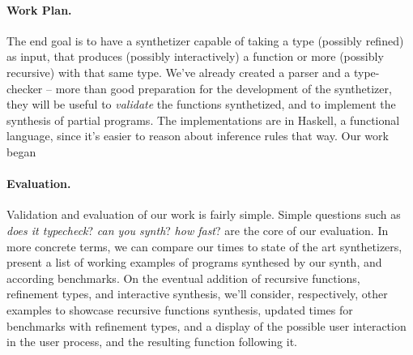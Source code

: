 \documentclass{llncs}
\newcommand{\lolli}{\multimap}
\newcommand{\tensor}{\otimes}
\newcommand{\one}{\mathbf{1}}
\newcommand{\bang}{{!}}
\newcommand{\mypara}[1]{\paragraph{\textbf{#1}.}}
\newcommand{\llet}[2]{\mathsf{let}\,#1\,\mathsf{in}\,#2}
\begin{document}
\mypara{Work Plan}
The end goal is to have a synthetizer capable of taking a type (possibly refined) as input,
that produces (possibly interactively) a function or more (possibly recursive) with that same type.
We've already created a parser and a type-checker -- more than good preparation for the
development of the synthetizer, they will be useful to \emph{validate} the functions synthetized, and to implement the
synthesis of partial programs. The implementations are in Haskell, a functional language, since it's easier to reason about inference rules that way.
Our work began 

\mypara{Evaluation}
Validation and evaluation of our work is fairly simple. Simple questions such as \emph{does it typecheck}? \emph{can you synth}? \emph{how fast}?
are the core of our evaluation. In more concrete terms, we can compare our times to state of the art synthetizers, present a list of working examples
of programs synthesed by our synth, and according benchmarks. On the eventual addition of recursive functions, refinement types, and interactive synthesis,
we'll consider, respectively, other examples to showcase recursive functions synthesis, updated times for benchmarks with refinement types, and a display of
the possible user interaction in the user process, and the resulting function following it.






\end{document}
